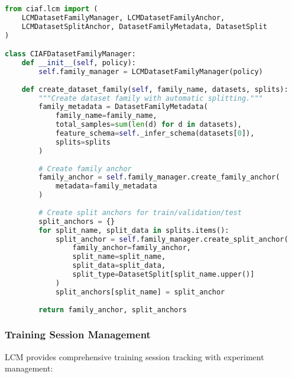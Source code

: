 \documentclass[12pt,a4paper]{article}
\begin{document}
\begin{lstlisting}[language=Python, caption=Dataset Family Manager Implementation]
from ciaf.lcm import (
    LCMDatasetFamilyManager, LCMDatasetFamilyAnchor,
    LCMDatasetSplitAnchor, DatasetFamilyMetadata, DatasetSplit
)

class CIAFDatasetFamilyManager:
    def __init__(self, policy):
        self.family_manager = LCMDatasetFamilyManager(policy)
        
    def create_dataset_family(self, family_name, datasets, splits):
        """Create dataset family with automatic splitting."""
        family_metadata = DatasetFamilyMetadata(
            family_name=family_name,
            total_samples=sum(len(d) for d in datasets),
            feature_schema=self._infer_schema(datasets[0]),
            splits=splits
        )
        
        # Create family anchor
        family_anchor = self.family_manager.create_family_anchor(
            metadata=family_metadata
        )
        
        # Create split anchors for train/validation/test
        split_anchors = {}
        for split_name, split_data in splits.items():
            split_anchor = self.family_manager.create_split_anchor(
                family_anchor=family_anchor,
                split_name=split_name,
                split_data=split_data,
                split_type=DatasetSplit[split_name.upper()]
            )
            split_anchors[split_name] = split_anchor
            
        return family_anchor, split_anchors
\end{lstlisting}

\subsubsection{Training Session Management}

LCM provides comprehensive training session tracking with experiment management:
\end{document}

